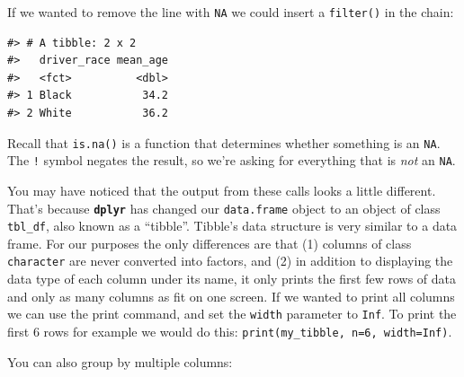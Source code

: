 \documentclass[]{book}
\newenvironment{Shaded}{\begin{snugshade}}{\end{snugshade}}
\newcommand{\KeywordTok}[1]{\textcolor[rgb]{0.13,0.29,0.53}{\textbf{#1}}}
\newcommand{\DataTypeTok}[1]{\textcolor[rgb]{0.13,0.29,0.53}{#1}}
\newcommand{\StringTok}[1]{\textcolor[rgb]{0.31,0.60,0.02}{#1}}
\newcommand{\OtherTok}[1]{\textcolor[rgb]{0.56,0.35,0.01}{#1}}
\newcommand{\OperatorTok}[1]{\textcolor[rgb]{0.81,0.36,0.00}{\textbf{#1}}}
\newcommand{\NormalTok}[1]{#1}
\theoremstyle{definition}
\theoremstyle{definition}
\theoremstyle{definition}
\theoremstyle{remark}
\begin{document}
If we wanted to remove the line with \texttt{NA} we could insert a
\texttt{filter()} in the chain:

\begin{Shaded}
\end{Shaded}

\begin{verbatim}
#> # A tibble: 2 x 2
#>   driver_race mean_age
#>   <fct>          <dbl>
#> 1 Black           34.2
#> 2 White           36.2
\end{verbatim}

Recall that \texttt{is.na()} is a function that determines whether
something is an \texttt{NA}. The \texttt{!} symbol negates the result,
so we're asking for everything that is \emph{not} an \texttt{NA}.

You may have noticed that the output from these calls looks a little
different. That's because \textbf{\texttt{dplyr}} has changed our
\texttt{data.frame} object to an object of class \texttt{tbl\_df}, also
known as a ``tibble''. Tibble's data structure is very similar to a data
frame. For our purposes the only differences are that (1) columns of
class \texttt{character} are never converted into factors, and (2) in
addition to displaying the data type of each column under its name, it
only prints the first few rows of data and only as many columns as fit
on one screen. If we wanted to print all columns we can use the print
command, and set the \texttt{width} parameter to \texttt{Inf}. To print
the first 6 rows for example we would do this:
\texttt{print(my\_tibble,\ n=6,\ width=Inf)}.

You can also group by multiple columns:

\begin{Shaded}
\end{Shaded}
\end{document}
